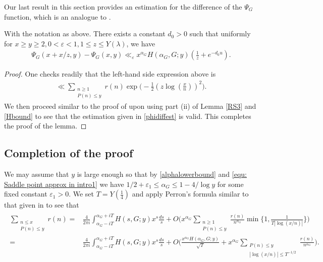 \documentclass[twoside,leqno,10pt, A4]{amsart}
\begin{document}
   Our last result in this section provides an estimation for the difference of the $\Psi_G$ function, which is an analogue to \cite[Lemma 9]{HT86}.
\begin{lemma}
\label{lemphidiffbound}
  With the notation as above. There exists a constant $d_0>0$ such that uniformly for $x \geq y \geq 2, 0<\varepsilon <1, 1 \leq z \leq Y(\lambda)$, we have
\begin{align}
\label{phidiffest}
  \Psi_G(x+x/z,y)-\Psi_G(x,y) \ll _{\varepsilon} x^{\alpha_G}H(\alpha_G,G;y)(\frac 1z+e^{-d_0u}).
\end{align}
\end{lemma}  
\begin{proof}
 One checks readily that the left-hand side expression above is
\begin{align*}
  \ll \sum_{\substack{n \geq 1 \\ P(n) \leq y}}r(n)\exp \Big (-\frac 12 (z\log (\frac {x}{n}))^2 \Big ).
\end{align*}
  We then proceed similar to the proof of \cite[Lemma 9]{HT86} upon using part (ii) of Lemma \ref{RS3} and \eqref{Hbound} to see that the estimation given in \eqref{phidiffest} is valid. This completes the proof of the lemma. 
\end{proof}



\subsection{Completion of the proof}
  
  We may assume that $y$ is large enough so that by \eqref{alphalowerbound} and \eqref{equ: Saddle point approx in intro1} we have $1/2+\varepsilon_1 \leq \alpha_G \leq 1-4/\log y$ for some fixed constant $\varepsilon_1>0$. We set $T=Y(\frac 14)$ and apply Perron's formula similar to that given in \cite[(4.5)]{MVa1} to see that
\begin{align}
\label{sumhlambda}
\begin{split}
\sum_{\substack{n \leq x \\ P(n) \leq y}} r(n) =&  \frac{4}{2 \pi i} \int_{\alpha_G - i T}^{\alpha_G + iT} H(s,G;y) x^s \frac{ds}{s} + O \Biggl(  x^{\alpha_G}\sum_{\substack{n \geq 1 \\ P(n) \leq y}}\frac {r(n)}{n^{\alpha_G}}\min \biggl\{ 1, \frac{1}{T|\log (x/n)|}\biggl\} \Biggr) \\
=& \frac{4}{2 \pi i} \int_{\alpha_G - i T}^{\alpha_G + iT} H(s,G;y) x^s \frac{ds}{s} + O \Biggl(  \frac {x^{\alpha_G}H(\alpha_G, G;y)}{\sqrt{T}}+ x^{\alpha_G}\sum_{\substack{ P(n) \leq y \\ |\log (x/n)| \leq T^{-1/2}}}\frac {r(n)}{n^{\alpha_G}}\Biggr).
\end{split} 
\end{align} 
  
\end{document}
